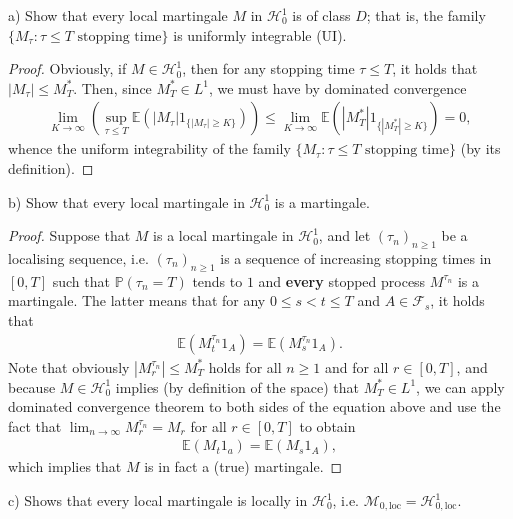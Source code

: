 \documentclass[12pt,a4paper, twoside]{article}
\theoremstyle{definition}
\newcommand{\EE}{\mathbb{E}} %
\newcommand{\PP}{\mathbb{P}} %
\begin{document}
a) Show that every local martingale $M$ in $\mathcal{H}_0^1$ is of class $D$; that is, the family $\{ M_\tau : \tau \leq T \text{ stopping time\}}$ is uniformly integrable (UI). 
\begin{proof}
Obviously,  if $M \in \mathcal{H}_0^1$, then for any stopping time $\tau \leq T$, it holds that $| M_\tau | \leq M_T^*$. Then, since $M_T^* \in L^1$, we must have by dominated convergence
\begin{align*}
\lim_{K \to \infty} \left( \sup_{ \tau \leq T} \EE( |M_\tau| 1_{\{ | M_\tau| \geq K \}} ) \right) \leq \lim_{K \to \infty} \EE( |M_T^*| 1_{\{ |M_T^*| \geq K\}} )=0,
\end{align*}
whence the uniform integrability of the family $\{ M_\tau : \tau \leq T \text{ stopping time}\}$ (by its definition). 
\end{proof}
\noindent b) Show that every local martingale in $\mathcal{H}_0^1$ is a martingale. 
\begin{proof}
Suppose that $M$ is a local martingale in $\mathcal{H}_0^1$, and let $( \tau_n)_{n \geq 1}$ be a localising sequence, i.e. $(\tau_n)_{n \geq 1}$ is a sequence of increasing stopping times in $[0,T]$ such that $\PP(\tau_n =T)$ tends to $1$ and \textbf{every} stopped process $M^{\tau_n}$ is a martingale. The latter means that for any $0 \leq s <t \leq T$ and $A \in \mathcal{F}_s$, it holds that 
\begin{align*}
\EE( M_t^{\tau_n} 1_A)= \EE(M_s^{\tau_n} 1_A).
\end{align*}
Note that obviously $|M_r^{\tau_n}| \leq M_T^*$ holds for all $n \geq 1$ and for all $r \in [0,T]$, and because $M \in \mathcal{H}_0^1$ implies (by definition of the space) that $M_T^* \in L^1$, we can apply dominated convergence theorem to both sides of the equation above and use the fact that $\lim_{n \to \infty} M_r^{\tau_n} = M_r$ for all $r \in [0,T]$ to obtain
\begin{align*}
\EE(M_t 1_a) = \EE(M_s 1_A),
\end{align*}
which implies that $M$ is in fact a (true) martingale. 
\end{proof}
\noindent c) Shows that every local martingale is locally in $\mathcal{H}_0^1$, i.e. $\mathcal{M}_{0,\text{loc}}= \mathcal{H}_{0, \text{loc}}^1$. 
\end{document}
